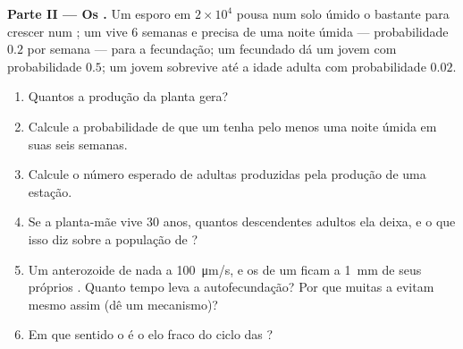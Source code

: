 \begin{problem}
\medskip
\noindent\textbf{Parte II --- Os .}
Um esporo em $2\times 10^{4}$ pousa num solo úmido o bastante para
crescer num ; um  vive \num{6} semanas e precisa de uma
noite úmida --- probabilidade $0.2$ por semana --- para a fecundação;
um  fecundado dá um jovem  com probabilidade
$0.5$; um jovem  sobrevive até a idade adulta com
probabilidade $0.02$.
\begin{enumerate}[resume]
  \item Quantos  a produção da planta gera?
  \item Calcule a probabilidade de que um  tenha pelo menos uma
        noite úmida em suas seis semanas.
  \item Calcule o número esperado de  adultas produzidas pela
        produção de uma estação.
  \item Se a planta-mãe vive \num{30} anos, quantos descendentes
        adultos ela deixa, e o que isso diz sobre a população de
        ?
  \item Um anterozoide de  nada a \qty{100}{\micro m/s}, e os  de um  ficam a \qty{1}{mm} de
        seus próprios . Quanto tempo leva a autofecundação?
        Por que muitas  a evitam mesmo assim (dê um
        mecanismo)?
  \item Em que sentido o  é o elo fraco do ciclo das
        ?
\end{enumerate}


\end{problem}
